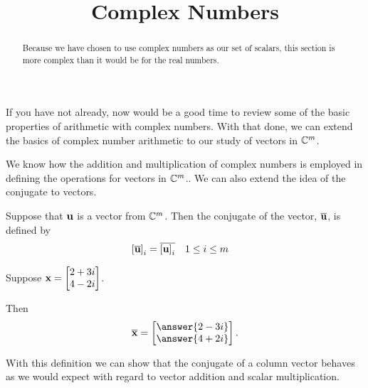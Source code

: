 \documentclass{ximera}
\title{Complex Numbers}
\begin{document}
\begin{abstract}
  Because we have chosen to use complex numbers as our set of scalars,
  this section is more complex than it would be for the real
  numbers.
\end{abstract}
\maketitle

If you have not already, now would be a good time to review some of
the basic properties of arithmetic with complex numbers.  With that
done, we can extend the basics of complex number arithmetic to our
study of vectors in $\mathbb{C}^{m}$.

We know how the addition and multiplication of complex numbers is
employed in defining the operations for vectors in $\mathbb{C}^{m}$..  We
can also extend the idea of the conjugate to vectors.

\begin{definition}
  Suppose that $\mathbf{u}$ is a vector from $\mathbb{C}^{m}$.  Then the
  conjugate of the vector, $\overline{\mathbf{u}}$, is defined by
  \begin{align*}
    \left\lbrack\overline{\mathbf{u}}\right\rbrack_{i}
    &=\overline{\left\lbrack\mathbf{u}\right\rbrack_{i}}
    &&\text{$1\leq i\leq m$}
  \end{align*}
\end{definition}

\begin{example}
  Suppose $\mathbf{x} = \begin{bmatrix} 2 + 3i \\ 4 - 2i \end{bmatrix}$.

  Then
  \[
    \conjugate{\vect{x}} = \begin{bmatrix} \answer{2 - 3i} \\ \answer{4 + 2i} \end{bmatrix}.
  \]
\end{example}

With this definition we can show that the conjugate of a column vector behaves as we would expect with regard to vector addition and scalar multiplication.
\end{document}
